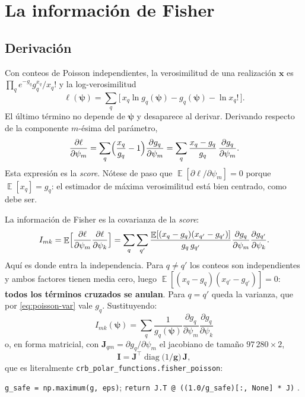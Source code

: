 \documentclass[11pt,a4paper]{article}
\newcommand{\vect}[1]{\boldsymbol{#1}}
\newcommand{\matr}[1]{\mathbf{#1}}
\newcommand{\code}[1]{\texttt{#1}}
\DeclareMathOperator*{\E}{\mathbb{E}}
\theoremstyle{definition}
\theoremstyle{plain}
\begin{document}
\section{La información de Fisher}
\label{sec:fisher}

\subsection{Derivación}

Con conteos de Poisson independientes, la verosimilitud de una realización
$\vect x$ es $\prod_q e^{-g_q}g_q^{x_q}/x_q!$ y la log-verosimilitud
%
\begin{equation}
\label{eq:loglik}
\ell(\vect\psi) = \sum_q \bigl[\, x_q\ln g_q(\vect\psi) - g_q(\vect\psi)
- \ln x_q!\,\bigr].
\end{equation}
%
El último término no depende de $\vect\psi$ y desaparece al derivar. Derivando
respecto de la componente $m$-ésima del parámetro,
%
\begin{equation}
\label{eq:score}
\frac{\partial\ell}{\partial\psi_m}
= \sum_q \Bigl(\frac{x_q}{g_q}-1\Bigr)\frac{\partial g_q}{\partial\psi_m}
= \sum_q \frac{x_q-g_q}{g_q}\,\frac{\partial g_q}{\partial\psi_m} .
\end{equation}
%
Esta expresión es la \emph{score}. Nótese de paso que
$\E[\partial\ell/\partial\psi_m]=0$ porque $\E[x_q]=g_q$: el estimador de máxima
verosimilitud está bien centrado, como debe ser.

La información de Fisher es la covarianza de la \emph{score}:
%
\begin{equation}
\label{eq:def-fisher}
I_{mk} = \E\Bigl[\frac{\partial\ell}{\partial\psi_m}
                 \frac{\partial\ell}{\partial\psi_k}\Bigr]
       = \sum_{q}\sum_{q'}
         \frac{\E[(x_q-g_q)(x_{q'}-g_{q'})]}{g_q\,g_{q'}}
         \frac{\partial g_q}{\partial\psi_m}
         \frac{\partial g_{q'}}{\partial\psi_k} .
\end{equation}
%
Aquí es donde entra la independencia. Para $q\ne q'$ los conteos son
independientes y ambos factores tienen media cero, luego
$\E[(x_q-g_q)(x_{q'}-g_{q'})]=0$: \textbf{todos los términos cruzados se
anulan}. Para $q=q'$ queda la varianza, que por \eqref{eq:poisson-var} vale
$g_q$. Sustituyendo:
%
\begin{equation}
\label{eq:fisher}
\boxed{\ 
I_{mk}(\vect\psi) = \sum_q \frac{1}{g_q(\vect\psi)}
  \frac{\partial g_q}{\partial\psi_m}
  \frac{\partial g_q}{\partial\psi_k}\ }
\end{equation}
%
o, en forma matricial, con $\matr J_{qm}=\partial g_q/\partial\psi_m$ el
jacobiano de tamaño $97\,280\times2$,
%
\begin{equation}
\label{eq:fisher-mat}
\matr I = \matr J^\top \operatorname{diag}\!\bigl(1/\vect g\bigr)\, \matr J ,
\end{equation}
%
que es literalmente \code{crb\_polar\_functions.fisher\_poisson}:
%
\begin{center}
\code{g\_safe = np.maximum(g, eps)};\quad
\code{return J.T @ ((1.0/g\_safe)[:, None] * J)} .
\end{center}
\end{document}
